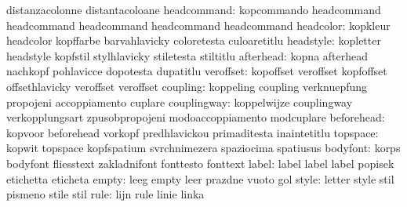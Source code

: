                            distanzacolonne           distantacoloane
              headcommand: kopcommando               headcommand
                           headcommand               headcommand
                           headcommand               headcommand
                headcolor: kopkleur                  headcolor
                           kopffarbe                 barvahlavicky
                           coloretesta               culoaretitlu
                headstyle: kopletter                 headstyle
                           kopfstil                  stylhlavicky
                           stiletesta                stiltitlu
                afterhead: kopna                     afterhead
                           nachkopf                  pohlavicce
                           dopotesta                 dupatitlu
                veroffset: kopoffset                 veroffset
                           kopfoffset                offsethlavicky
                           veroffset                 veroffset %
                 coupling: koppeling                 coupling
                           verknuepfung              propojeni
                           accoppiamento             cuplare
              couplingway: koppelwijze               couplingway
                           verkopplungsart           zpusobpropojeni
                           modoaccoppiamento         modcuplare
               beforehead: kopvoor                   beforehead
                           vorkopf                   predhlavickou
                           primaditesta              inaintetitlu
                 topspace: kopwit                    topspace
                           kopfspatium               svrchnimezera
                           spaziocima                spatiusus
                 bodyfont: korps                     bodyfont
                           fliesstext                zakladnifont
                           fonttesto                 fonttext
                    label: label                     label
                           label                     popisek
                           etichetta                 eticheta
                    empty: leeg                      empty
                           leer                      prazdne
                           vuoto                     gol
                    style: letter                    style
                           stil                      pismeno
                           stile                     stil
                     rule: lijn                      rule
                           linie                     linka
